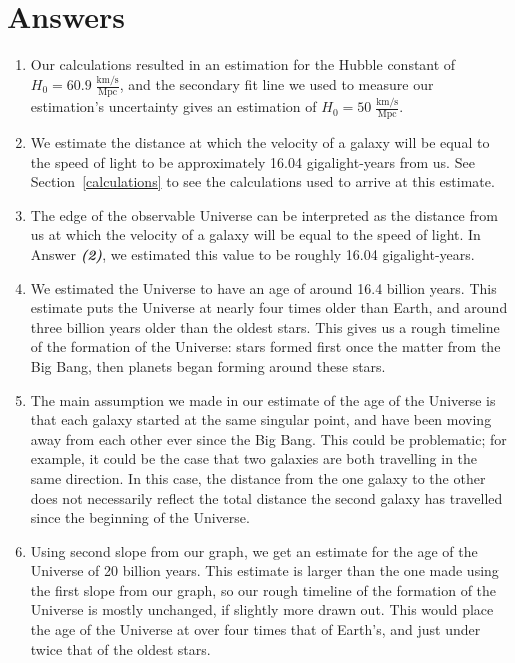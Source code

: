 \documentclass[11pt]{article}
\begin{document}
\section{Answers}
\begin{enumerate}[label={\textbf{\emph{(\arabic*)}}}]
	\item %
Our calculations resulted in an estimation for the Hubble constant of $H_0 = 60.9\;\frac{\textrm{km/s}}{\textrm{Mpc}}$, and the secondary fit line we used to measure our estimation's uncertainty gives an estimation of $H_0 = 50\;\frac{\textrm{km/s}}{\textrm{Mpc}}$.

	\item %
We estimate the distance at which the velocity of a galaxy will be equal to the speed of light to be approximately 16.04 gigalight-years from us.
See Section~\ref{calculations} to see the calculations used to arrive at this estimate.

	\item %
The edge of the observable Universe can be interpreted as the distance from us at which the velocity of a galaxy will be equal to the speed of light.
In Answer \textbf{\emph{(2)}}, we estimated this value to be roughly 16.04 gigalight-years.

	\item %
We estimated the Universe to have an age of around 16.4 billion years.
This estimate puts the Universe at nearly four times older than Earth, and around three billion years older than the oldest stars.
This gives us a rough timeline of the formation of the Universe: stars formed first once the matter from the Big Bang, then planets began forming around these stars.

	\item %
The main assumption we made in our estimate of the age of the Universe is that each galaxy started at the same singular point, and have been moving away from each other ever since the Big Bang.
This could be problematic; for example, it could be the case that two galaxies are both travelling in the same direction.
In this case, the distance from the one galaxy to the other does not necessarily reflect the total distance the second galaxy has travelled since the beginning of the Universe.

	\item %
Using second slope from our graph, we get an estimate for the age of the Universe of 20 billion years.
This estimate is larger than the one made using the first slope from our graph, so our rough timeline of the formation of the Universe is mostly unchanged, if slightly more drawn out.
This would place the age of the Universe at over four times that of Earth's, and just under twice that of the oldest stars.

\end{enumerate}
\end{document}
